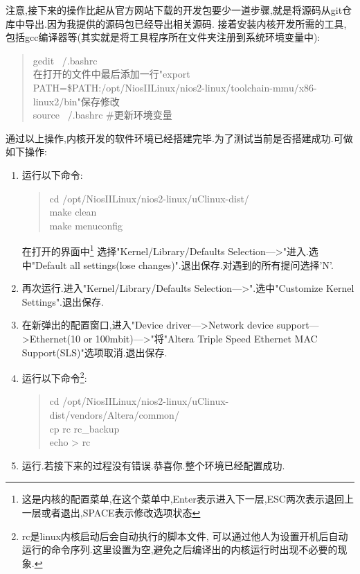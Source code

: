 \documentclass[12pt,a4paper,titlepage]{article}
\begin{document}
{注意,接下来的操作比起从官方网站下载的开发包要少一道步骤,就是将源码从git仓库中导出.因为我提供的源码包已经导出相关源码.}
接着安装内核开发所需的工具,包括gcc编译器等(其实就是将工具程序所在文件夹注册到系统环境变量中):
\begin{verse}
gedit ~/.bashrc\\在打开的文件中最后添加一行"export PATH=\$PATH:/opt/NiosIILinux/nios2-linux/toolchain-mmu/x86-linux2/bin"保存修改\\
source ~/.bashrc \#更新环境变量
\end{verse}
通过以上操作,内核开发的软件环境已经搭建完毕.为了测试当前是否搭建成功.可做如下操作:
\begin{enumerate}
\item 运行以下命令:
\begin{verse}
cd /opt/NiosIILinux/nios2-linux/uClinux-dist/\\make clean\\make menuconfig
\end{verse}
在打开的界面中\footnote{这是内核的配置菜单,在这个菜单中,Enter表示进入下一层,ESC两次表示退回上一层或者退出,SPACE表示修改选项状态}
选择"Kernel/Library/Defaults Selection--->"进入.选中"Default all settings(lose changes)".退出保存.对遇到的所有提问选择'N'.
\item 再次运行.进入"Kernel/Library/Defaults Selection--->".选中"Customize Kernel Settings".退出保存.
\item 在新弹出的配置窗口,进入"Device driver--->Network device support--->Ethernet(10 or 100mbit)--->"将"Altera Triple Speed Ethernet 
MAC Support(SLS)"选项取消.退出保存.
\item 运行以下命令\footnote{rc是linux内核启动后会自动执行的脚本文件,
可以通过他人为设置开机后自动运行的命令序列.这里设置为空,避免之后编译出的内核运行时出现不必要的现象.}:
\begin{verse}cd /opt/NiosIILinux/nios2-linux/uClinux-dist/vendors/Altera/common/\\cp rc rc\_backup\\echo > rc\end{verse}
\item 运行.若接下来的过程没有错误.恭喜你.整个环境已经配置成功.
\end{enumerate}
\end{document}
